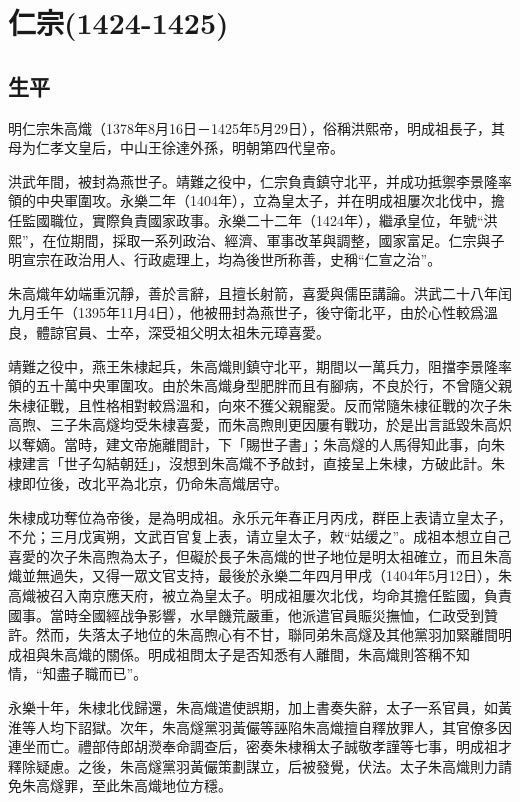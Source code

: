 
\section{仁宗\tiny(1424-1425)}

\subsection{生平}

明仁宗朱高熾（1378年8月16日－1425年5月29日），俗稱洪熙帝，明成祖長子，其母为仁孝文皇后，中山王徐達外孫，明朝第四代皇帝。

洪武年間，被封為燕世子。靖難之役中，仁宗負責鎮守北平，并成功抵禦李景隆率領的中央軍圍攻。永樂二年（1404年），立為皇太子，并在明成祖屢次北伐中，擔任監國職位，實際負責國家政事。永樂二十二年（1424年），繼承皇位，年號“洪熙”，在位期間，採取一系列政治、經濟、軍事改革與調整，國家富足。仁宗與子明宣宗在政治用人、行政處理上，均為後世所称善，史稱“仁宣之治”。

朱高熾年幼端重沉靜，善於言辭，且擅长射箭，喜愛與儒臣講論。洪武二十八年闰九月壬午（1395年11月4日），他被冊封為燕世子，後守衛北平，由於心性較爲溫良，體諒官員、士卒，深受祖父明太祖朱元璋喜愛。

靖難之役中，燕王朱棣起兵，朱高熾則鎮守北平，期間以一萬兵力，阻擋李景隆率領的五十萬中央軍圍攻。由於朱高熾身型肥胖而且有腳病，不良於行，不曾隨父親朱棣征戰，且性格相對較爲溫和，向來不獲父親寵愛。反而常隨朱棣征戰的次子朱高煦、三子朱高燧均受朱棣喜愛，而朱高煦則更因屢有戰功，於是出言詆毀朱高炽以奪嫡。當時，建文帝施離間計，下「賜世子書」；朱高燧的人馬得知此事，向朱棣建言「世子勾結朝廷」，沒想到朱高熾不予啟封，直接呈上朱棣，方破此計。朱棣即位後，改北平為北京，仍命朱高熾居守。

朱棣成功奪位為帝後，是為明成祖。永乐元年春正月丙戌，群臣上表请立皇太子，不允；三月戊寅朔，文武百官复上表，请立皇太子，敕“姑缓之”。成祖本想立自己喜愛的次子朱高煦為太子，但礙於長子朱高熾的世子地位是明太祖確立，而且朱高熾並無過失，又得一眾文官支持，最後於永樂二年四月甲戌（1404年5月12日），朱高熾被召入南京應天府，被立為皇太子。明成祖屢次北伐，均命其擔任監國，負責國事。當時全國經战争影響，水旱饑荒嚴重，他派遣官員賑災撫恤，仁政受到贊許。然而，失落太子地位的朱高煦心有不甘，聯同弟朱高燧及其他黨羽加緊離間明成祖與朱高熾的關係。明成祖問太子是否知悉有人離間，朱高熾則答稱不知情，“知盡子職而已”。

永樂十年，朱棣北伐歸還，朱高熾遣使誤期，加上書奏失辭，太子一系官員，如黃淮等人均下詔獄。次年，朱高燧黨羽黃儼等誣陷朱高熾擅自釋放罪人，其官僚多因連坐而亡。禮部侍郎胡濙奉命調查后，密奏朱棣稱太子誠敬孝謹等七事，明成祖才釋除疑慮。之後，朱高燧黨羽黃儼策劃謀立，后被發覺，伏法。太子朱高熾則力請免朱高燧罪，至此朱高熾地位方穩。

